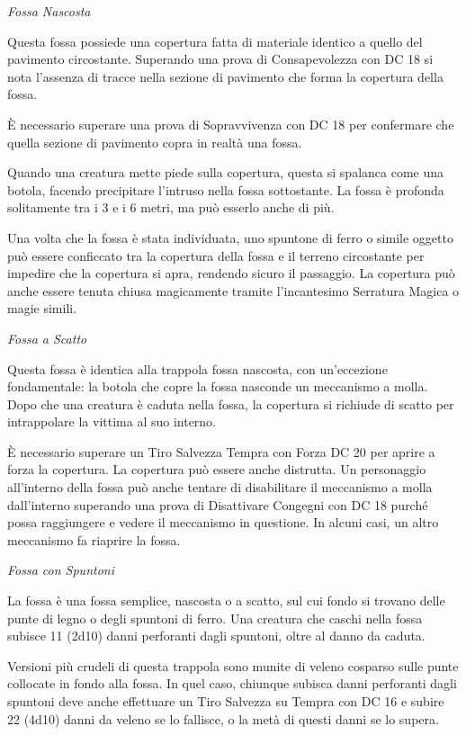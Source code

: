 \begin{multicols}{2}
\medskip

\emph{Fossa Nascosta}

Questa fossa possiede una copertura fatta di materiale identico a quello del pavimento circostante.
Superando una prova di Consapevolezza con DC 18 si nota l'assenza di tracce nella sezione di pavimento che forma la copertura della fossa.

È necessario superare una prova di Sopravvivenza con DC 18 per confermare che quella sezione di pavimento copra in realtà una fossa.

Quando una creatura mette piede sulla copertura, questa si spalanca come una botola, facendo precipitare l'intruso nella fossa sottostante. La fossa è profonda solitamente tra i 3 e i 6 metri, ma può esserlo anche di più.

Una volta che la fossa è stata individuata, uno spuntone di ferro o simile oggetto può essere conficcato tra la copertura della fossa e il terreno circostante per impedire che la copertura si apra, rendendo sicuro il passaggio. La copertura può anche essere tenuta chiusa magicamente tramite l'incantesimo Serratura Magica o magie simili.

\medskip
\emph{Fossa a Scatto}

Questa fossa è identica alla trappola fossa nascosta, con un'eccezione fondamentale: la botola che copre la fossa nasconde un meccanismo a molla. Dopo che una creatura è caduta nella fossa, la copertura si richiude di scatto per intrappolare la vittima al suo interno.

È necessario superare un Tiro Salvezza Tempra con Forza DC 20 per aprire a forza la copertura. La copertura può essere anche distrutta. Un personaggio all'interno della fossa può anche tentare di disabilitare il meccanismo a molla dall'interno superando una prova di Disattivare Congegni con DC 18 purché possa raggiungere e vedere il meccanismo in questione. In alcuni casi, un altro meccanismo fa riaprire la fossa.

\medskip

\emph{Fossa con Spuntoni}

La fossa è una fossa semplice, nascosta o a scatto, sul cui fondo si trovano delle punte di legno o degli spuntoni di ferro. Una creatura che caschi nella fossa subisce 11 (2d10) danni perforanti dagli spuntoni, oltre al danno da caduta.

Versioni più crudeli di questa trappola sono munite di veleno cosparso sulle punte collocate in fondo alla fossa. In quel caso, chiunque subisca danni perforanti dagli spuntoni deve anche effettuare un Tiro Salvezza su Tempra con DC 16 e subire 22 (4d10) danni da veleno se lo fallisce, o la metà di questi danni se lo supera.


\end{multicols}
